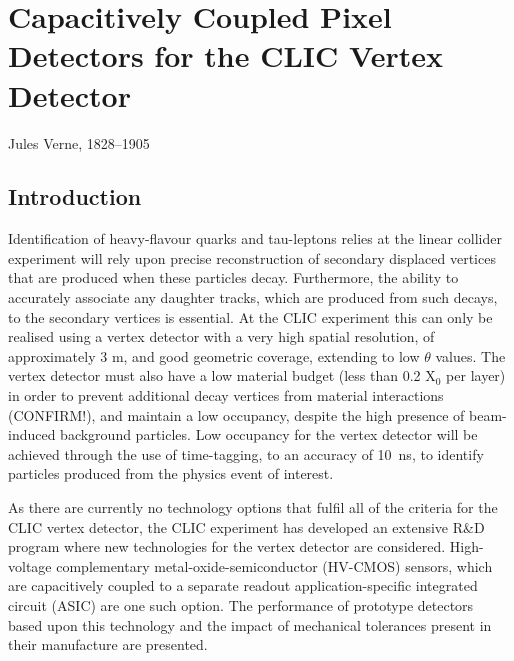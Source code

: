 \chapter{Capacitively Coupled Pixel Detectors for the CLIC Vertex Detector}
\label{chap:theory}

{Jules Verne, 1828--1905}


\section{Introduction}

Identification of heavy-flavour quarks and tau-leptons relies at the linear collider experiment will rely upon precise reconstruction of secondary displaced vertices that are produced when these particles decay.  Furthermore, the ability to accurately associate any daughter tracks, which are produced from such decays, to the secondary vertices is essential.  At the CLIC experiment this can only be realised using a vertex detector with a very high spatial resolution, of approximately 3 {\mu}m, and good geometric coverage, extending to low $\theta$ values.  The vertex detector must also have a low material budget (less than 0.2 $\text{X}_{0}$ per layer) in order to prevent additional decay vertices from material interactions (CONFIRM!), and maintain a low occupancy, despite the high presence of beam-induced background particles.  Low occupancy for the vertex detector will be achieved through the use of time-tagging, to an accuracy of 10~ns, to identify particles produced from the physics event of interest.  

As there are currently no technology options that fulfil all of the criteria for the CLIC vertex detector, the CLIC experiment has developed an extensive R\&D program where new technologies for the vertex detector are considered.  High-voltage complementary metal-oxide-semiconductor (HV-CMOS) sensors, which are capacitively coupled to a separate readout application-specific integrated circuit (ASIC) are one such option. The performance of prototype detectors based upon this technology and the impact of mechanical tolerances present in their manufacture are presented.  


